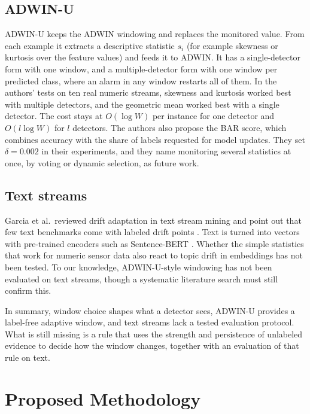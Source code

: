 \documentclass[conference]{IEEEtran}
\begin{document}
\subsection{ADWIN-U}

ADWIN-U \cite{assis2025} keeps the ADWIN windowing and replaces the monitored value. From each example it extracts a descriptive statistic $s_i$ (for example skewness or kurtosis over the feature values) and feeds it to ADWIN. It has a single-detector form with one window, and a multiple-detector form with one window per predicted class, where an alarm in any window restarts all of them. In the authors' tests on ten real numeric streams, skewness and kurtosis worked best with multiple detectors, and the geometric mean worked best with a single detector. The cost stays at $O(\log W)$ per instance for one detector and $O(l\log W)$ for $l$ detectors. The authors also propose the BAR score, which combines accuracy with the share of labels requested for model updates. They set $\delta=0.002$ in their experiments, and they name monitoring several statistics at once, by voting or dynamic selection, as future work.

\subsection{Text streams}

Garcia et al.\ reviewed drift adaptation in text stream mining and point out that few text benchmarks come with labeled drift points \cite{garcia2024review}. Text is turned into vectors with pre-trained encoders such as Sentence-BERT \cite{reimers2019}. Whether the simple statistics that work for numeric sensor data also react to topic drift in embeddings has not been tested. To our knowledge, ADWIN-U-style windowing has not been evaluated on text streams, though a systematic literature search must still confirm this.

In summary, window choice shapes what a detector sees, ADWIN-U provides a label-free adaptive window, and text streams lack a tested evaluation protocol. What is still missing is a rule that uses the strength and persistence of unlabeled evidence to decide how the window changes, together with an evaluation of that rule on text.

\section{Proposed Methodology}
\label{sec:method}
\end{document}
